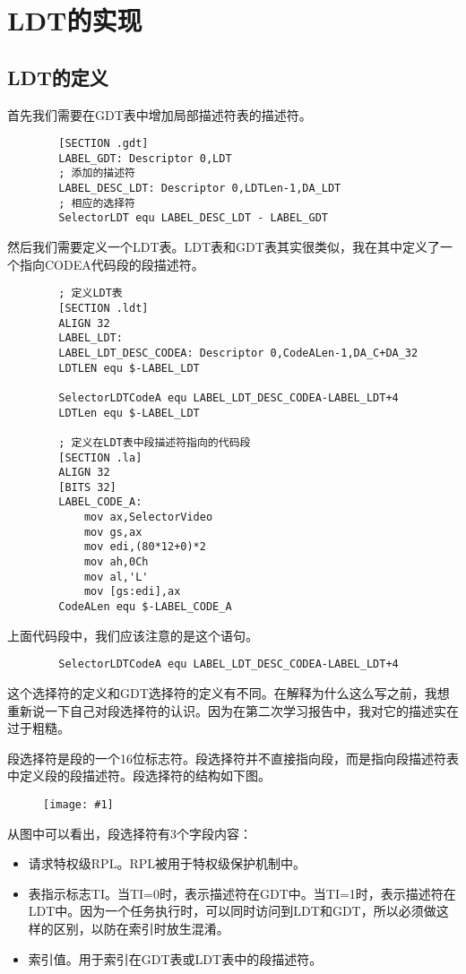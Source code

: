 \documentclass[a4paper,left=2.5cm,right=2.5cm,11pt]{article}
\newcommand{\fic}[1]{\begin{figure}[H]
		\center
		\texttt{[image: \#1]}
	\end{figure}}
\begin{document}
\clearpage

\section{LDT的实现}
\subsection{LDT的定义}
	首先我们需要在GDT表中增加局部描述符表的描述符。
	\begin{lstlisting}
		[SECTION .gdt]
		LABEL_GDT: Descriptor 0,LDT
		; 添加的描述符
		LABEL_DESC_LDT: Descriptor 0,LDTLen-1,DA_LDT
		; 相应的选择符
		SelectorLDT equ LABEL_DESC_LDT - LABEL_GDT
	\end{lstlisting}
	
	然后我们需要定义一个LDT表。LDT表和GDT表其实很类似，我在其中定义了一个指向CODEA代码段的段描述符。
	\begin{lstlisting}
		; 定义LDT表
		[SECTION .ldt]
		ALIGN 32
		LABEL_LDT:
		LABEL_LDT_DESC_CODEA: Descriptor 0,CodeALen-1,DA_C+DA_32
		LDTLEN equ $-LABEL_LDT
		
		SelectorLDTCodeA equ LABEL_LDT_DESC_CODEA-LABEL_LDT+4
		LDTLen equ $-LABEL_LDT
		
		; 定义在LDT表中段描述符指向的代码段
		[SECTION .la]
		ALIGN 32
		[BITS 32]
		LABEL_CODE_A:
			mov ax,SelectorVideo
			mov gs,ax
			mov edi,(80*12+0)*2
			mov ah,0Ch
			mov al,'L'
			mov [gs:edi],ax
		CodeALen equ $-LABEL_CODE_A
	\end{lstlisting}
	
	上面代码段中，我们应该注意的是这个语句。
	\begin{lstlisting}
		SelectorLDTCodeA equ LABEL_LDT_DESC_CODEA-LABEL_LDT+4
	\end{lstlisting}
	
	这个选择符的定义和GDT选择符的定义有不同。在解释为什么这么写之前，我想重新说一下自己对段选择符的认识。因为在第二次学习报告中，我对它的描述实在过于粗糙。\par
	段选择符是段的一个16位标志符。段选择符并不直接指向段，而是指向段描述符表中定义段的段描述符。段选择符的结构如下图。
	\fic{1.png}
	从图中可以看出，段选择符有3个字段内容：
	\begin{itemize}
		\item 请求特权级RPL。RPL被用于特权级保护机制中。
		\item 表指示标志TI。当TI=0时，表示描述符在GDT中。当TI=1时，表示描述符在LDT中。因为一个任务执行时，可以同时访问到LDT和GDT，所以必须做这样的区别，以防在索引时放生混淆。
		\item 索引值。用于索引在GDT表或LDT表中的段描述符。
	\end{itemize}
	
\end{document}
